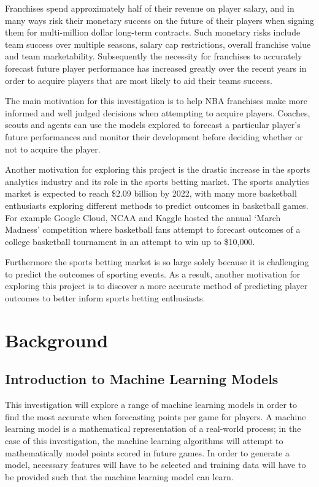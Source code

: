 \documentclass[a4paper,11pt,twoside]{article}
\begin{document}
Franchises spend approximately half of their revenue on player salary, and in many ways risk their monetary success on the future of their players when signing them for multi-million dollar long-term contracts. Such monetary risks include team success over multiple seasons, salary cap restrictions, overall franchise value and team marketability. Subsequently the necessity for franchises to accurately forecast future player performance has increased greatly over the recent years in order to acquire players that are most likely to aid their teams success.

The main motivation for this investigation is to help NBA franchises make more informed and well judged decisions when attempting to acquire players. Coaches, scouts and agents can use the models explored  to forecast a particular player's future performances and monitor their development before deciding whether or not to acquire the player. 

Another motivation for exploring this project is the drastic increase in the sports analytics industry and its role in the sports betting market. The sports analytics market is expected to reach \$2.09 billion by 2022, with many more basketball enthusiasts exploring different methods to predict outcomes in basketball games. For example Google Cloud, NCAA and Kaggle hosted the annual `March Madness' competition where basketball fans attempt to forecast outcomes of a college basketball tournament in an attempt to win up to \$10,000.

 Furthermore the sports betting market is so large solely because it is challenging to predict the outcomes of sporting events. As a result, another motivation for exploring this project is to discover a more accurate method of predicting player outcomes to better inform sports betting enthusiasts. 
 

\newpage

\section{Background}
\vspace{6mm}

\subsection{Introduction to Machine Learning Models}

This investigation will explore a range of machine learning models in order to find the most accurate when forecasting points per game for players. A machine learning model is a mathematical representation of a real-world process; in the case of this investigation, the machine learning algorithms will attempt to mathematically model points scored in future games. In order to generate a model, necessary features will have to be selected and training data will have to be provided such that the machine learning model can learn.
\end{document}
